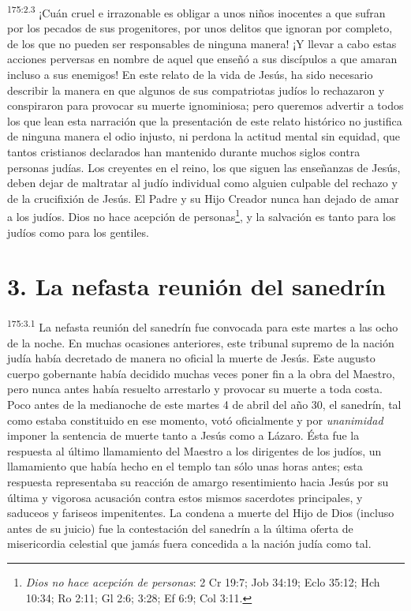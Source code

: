 \par 
\textsuperscript{175:2.3} ¡Cuán cruel e irrazonable es obligar a unos niños inocentes a que sufran por los pecados de sus progenitores, por unos delitos que ignoran por completo, de los que no pueden ser responsables de ninguna manera! ¡Y llevar a cabo estas acciones perversas en nombre de aquel que enseñó a sus discípulos a que amaran incluso a sus enemigos! En este relato de la vida de Jesús, ha sido necesario describir la manera en que algunos de sus compatriotas judíos lo rechazaron y conspiraron para provocar su muerte ignominiosa; pero queremos advertir a todos los que lean esta narración que la presentación de este relato histórico no justifica de ninguna manera el odio injusto, ni perdona la actitud mental sin equidad, que tantos cristianos declarados han mantenido durante muchos siglos contra personas judías. Los creyentes en el reino, los que siguen las enseñanzas de Jesús, deben dejar de maltratar al judío individual como alguien culpable del rechazo y de la crucifixión de Jesús. El Padre y su Hijo Creador nunca han dejado de amar a los judíos. Dios no hace acepción de personas\footnote{\textit{Dios no hace acepción de personas}: 2 Cr 19:7; Job 34:19; Eclo 35:12; Hch 10:34; Ro 2:11; Gl 2:6; 3:28; Ef 6:9; Col 3:11.}, y la salvación es tanto para los judíos como para los gentiles.

\section*{3. La nefasta reunión del sanedrín}
\par 
\textsuperscript{175:3.1} La nefasta reunión del sanedrín fue convocada para este martes a las ocho de la noche. En muchas ocasiones anteriores, este tribunal supremo de la nación judía había decretado de manera no oficial la muerte de Jesús. Este augusto cuerpo gobernante había decidido muchas veces poner fin a la obra del Maestro, pero nunca antes había resuelto arrestarlo y provocar su muerte a toda costa. Poco antes de la medianoche de este martes 4 de abril del año 30, el sanedrín, tal como estaba constituido en ese momento, votó oficialmente y por \textit{unanimidad} imponer la sentencia de muerte tanto a Jesús como a Lázaro. Ésta fue la respuesta al último llamamiento del Maestro a los dirigentes de los judíos, un llamamiento que había hecho en el templo tan sólo unas horas antes; esta respuesta representaba su reacción de amargo resentimiento hacia Jesús por su última y vigorosa acusación contra estos mismos sacerdotes principales, y saduceos y fariseos impenitentes. La condena a muerte del Hijo de Dios (incluso antes de su juicio) fue la contestación del sanedrín a la última oferta de misericordia celestial que jamás fuera concedida a la nación judía como tal.

